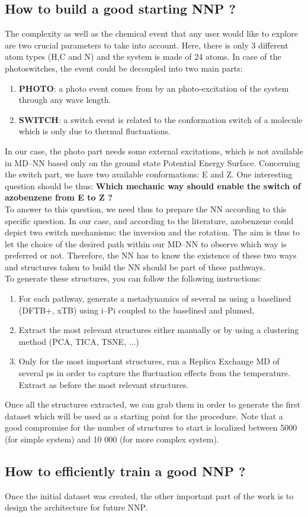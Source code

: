 \documentclass[12pt]{article}
\begin{document}
\subsection{How to build a good starting NNP ?}
The complexity as well as the chemical event that any user would like to explore are two crucial parameters to take into account. Here, there is only 3 different atom types (H,C and N) and the system is made of 24 atoms. In case of the photoswitches, the event could be decoupled into two main parts:
\begin{enumerate}
    \item \textbf{PHOTO}: a photo event comes from by an photo-excitation of the system through any wave length. 
    \item \textbf{SWITCH}: a switch event is related to the conformation switch of a molecule which is only due to thermal fluctuations.
\end{enumerate}
In our case, the photo part needs some external excitations, which is not available in MD--NN based only on the ground state Potential Energy Surface. Concerning the switch part, we have two available conformations: E and Z. One interesting question should be thus: \textbf{Which mechanic way should enable the switch of azobenzene from E to Z ?} \\
To answer to this question, we need thus to prepare the NN according to this specific question. In our case, and according to the literature, azobenzene could depict two switch mechanisms: the inversion and the rotation. The aim is thus to let the choice of the desired path within our MD--NN to observe which way is preferred or not. Therefore, the NN has to know the existence of these two ways and structures taken to build the NN should be part of these pathways. \\
To generate these structures, you can follow the following instructions:
\begin{enumerate}
    \item For each pathway, generate a metadynamics of several ns using a baselined (DFTB+, xTB) using i--Pi coupled to the baselined and plumed,
    \item Extract the most relevant structures either manually or by using a clustering method (PCA, TICA, TSNE, ...)
    \item Only for the most important structures, run a Replica Exchange MD of several ps in order to capture the fluctuation effects from the temperature. Extract as before the most relevant structures.
\end{enumerate}
Once all the structures extracted, we can grab them in order to generate the first dataset which will be used as a starting point for the procedure. Note that a good compromise for the number of structures to start is localized between 5000 (for simple system) and 10 000 (for more complex system). 
%
\subsection{How to efficiently train a good NNP ?}
Once the initial dataset was created, the other important part of the work is to design the architecture for future NNP.
\end{document}
